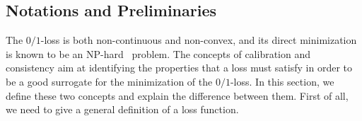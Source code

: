 






\subsection{Notations and Preliminaries}

The $0/1$-loss is both non-continuous and non-convex, and its direct minimization is known to be an NP-hard~\cite{xxx} problem. The concepts of calibration and consistency aim at identifying the properties that a loss must satisfy in order to be a good surrogate for the minimization of the $0/1$-loss. In this section, we define these two concepts and explain the difference between them. First of all, we need to give a general definition of a loss function.

